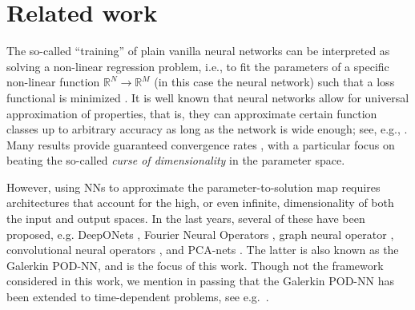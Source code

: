 \section{Related work}
\label{sec:introduction_related_work}
The so-called ``training'' of plain vanilla neural networks can be interpreted as solving a non-linear regression problem, i.e., to fit the parameters of a specific non-linear function $\mathbb{R}^N\to\mathbb{R}^M$ (in this case the neural network) such that a loss functional is minimized \cite{BGG2024,GK2022}. It is well known that neural networks allow for universal approximation of properties, that is, they can approximate certain function classes up to arbitrary accuracy as long as the network is wide enough; see, e.g., \cite{BGKP2019,Cyb1989,DHP2021,Hor1991,PV2018}. 
Many results provide guaranteed convergence rates \cite{de2022generic,DLM21,HOS22,SZ2019}, with a particular focus on beating the so-called \emph{curse of dimensionality} in the parameter space.

However, using NNs to approximate the parameter-to-solution map requires architectures that account for the high, or even infinite, dimensionality of both the input and output spaces. In the last years, several of these have been proposed, e.g. DeepONets
\cite{lu2021learning,lanthaler2022nonlinear,lanthaler2022error,prasthofer2022variable,wang2021learning},
Fourier Neural Operators \cite{guibas2021adaptive,kovachki2021universal,li2020fourier},
graph neural operator \cite{pichi2024graph},
convolutional neural operators \cite{franco2023approximation,raonic2023convolutional}, and PCA-nets \cite{bhattacharya2021model,herrmann2024neural,HU18,lanthaler2023operator,SZ2019}.
The latter is also known as the Galerkin POD-NN, and is the focus of this work.
Though not the framework considered in this work, we mention in passing 
that the Galerkin POD-NN has been extended to time-dependent 
problems, see e.g.~\cite{guo2019data,wang2019non,wang2020recurrent}.


